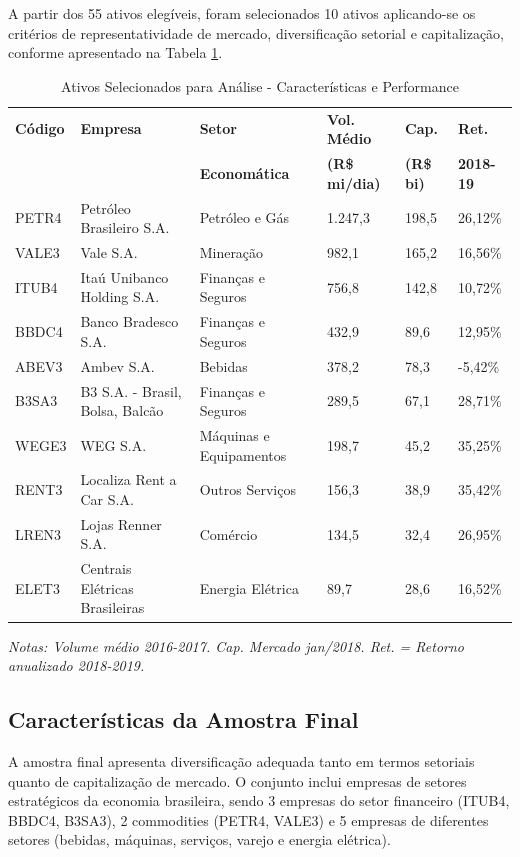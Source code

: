 A partir dos 55 ativos elegíveis, foram selecionados 10 ativos aplicando-se os critérios de representatividade de mercado, diversificação setorial e capitalização, conforme apresentado na Tabela \ref{tab:ativos_selecionados_performance}.

\begin{table}[H]
\centering
\caption{Ativos Selecionados para Análise - Características e Performance}
\begin{tabular}{|p{1.5cm}|p{4.5cm}|p{2.5cm}|p{1.8cm}|p{1.5cm}|p{1.3cm}|}
\hline
\textbf{Código} & \textbf{Empresa} & \textbf{Setor} & \textbf{Vol. Médio} & \textbf{Cap.} & \textbf{Ret.} \\
& & \textbf{Economática} & \textbf{(R\$ mi/dia)} & \textbf{(R\$ bi)} & \textbf{2018-19} \\
\hline
PETR4 & Petróleo Brasileiro S.A. & Petróleo e Gás & 1.247,3 & 198,5 & 26,12\% \\
\hline
VALE3 & Vale S.A. & Mineração & 982,1 & 165,2 & 16,56\% \\
\hline
ITUB4 & Itaú Unibanco Holding S.A. & Finanças e Seguros & 756,8 & 142,8 & 10,72\% \\
\hline
BBDC4 & Banco Bradesco S.A. & Finanças e Seguros & 432,9 & 89,6 & 12,95\% \\
\hline
ABEV3 & Ambev S.A. & Bebidas & 378,2 & 78,3 & -5,42\% \\
\hline
B3SA3 & B3 S.A. - Brasil, Bolsa, Balcão & Finanças e Seguros & 289,5 & 67,1 & 28,71\% \\
\hline
WEGE3 & WEG S.A. & Máquinas e Equipamentos & 198,7 & 45,2 & 35,25\% \\
\hline
RENT3 & Localiza Rent a Car S.A. & Outros Serviços & 156,3 & 38,9 & 35,42\% \\
\hline
LREN3 & Lojas Renner S.A. & Comércio & 134,5 & 32,4 & 26,95\% \\
\hline
ELET3 & Centrais Elétricas Brasileiras & Energia Elétrica & 89,7 & 28,6 & 16,52\% \\
\hline
\end{tabular}
\textit{Notas: Volume médio 2016-2017. Cap. Mercado jan/2018. Ret. = Retorno anualizado 2018-2019.}
\label{tab:ativos_selecionados_performance}
\end{table}

\subsection{Características da Amostra Final}

A amostra final apresenta diversificação adequada tanto em termos setoriais quanto de capitalização de mercado. O conjunto inclui empresas de setores estratégicos da economia brasileira, sendo 3 empresas do setor financeiro (ITUB4, BBDC4, B3SA3), 2 commodities (PETR4, VALE3) e 5 empresas de diferentes setores (bebidas, máquinas, serviços, varejo e energia elétrica).

